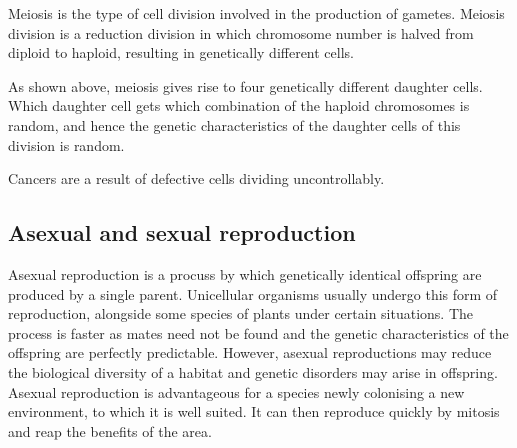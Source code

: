 Meiosis is the type of cell division involved in the production of gametes. Meiosis division is
a reduction division in which chromosome number is halved from diploid to haploid, resulting in
genetically different cells.

\begin{center}
\end{center}
As shown above, meiosis gives rise to four genetically different daughter cells. Which daughter 
cell gets which combination of the haploid chromosomes is random, and hence the genetic 
characteristics of the daughter cells of this division is random.

Cancers are a result of defective cells dividing uncontrollably.

\subsection{Asexual and sexual reproduction}

Asexual reproduction is a procuss by which genetically identical offspring are produced by a single
parent. Unicellular organisms usually undergo this form of reproduction, alongside some species
of plants under certain situations. The process is faster as mates need not be found and the
genetic characteristics of the offspring are perfectly predictable. However, asexual reproductions
may reduce the biological diversity of a habitat and genetic disorders may arise in offspring.
Asexual reproduction is advantageous for a species newly colonising a new environment, to which
it is well suited. It can then reproduce quickly by mitosis and reap the benefits of the area.


